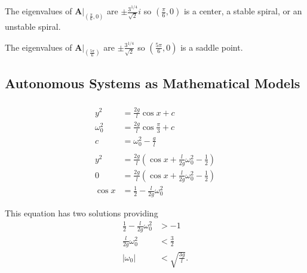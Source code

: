 \documentclass{article}
\begin{document}
\begin{enumerate}
        The eigenvalues of $\left. \mathbf{A} \right|_{\left( \frac{\pi}{6}, 0 \right)}$ are $\pm \frac{3^{1 / 4}}{\sqrt{2}} i$ so $\left( \frac{\pi}{6}, 0 \right)$ is a center, a stable spiral, or an unstable spiral.

        The eigenvalues of $\left. \mathbf{A} \right|_{\left( \frac{5 \pi}{6} \right)}$ are $\pm \frac{3^{1 / 4}}{\sqrt{2}}$ so $\left( \frac{5 \pi}{6}, 0 \right)$ is a saddle point.
\end{enumerate}

\subsection{Autonomous Systems as Mathematical Models}

\subsubsection{}

\begin{align*}
  y^2        & = \frac{2 g}{l} \cos x + c                                                     \\
  \omega_0^2 & = \frac{2 g}{l} \cos \frac{\pi}{3} + c                                         \\
  c          & = \omega_0^2 - \frac{g}{l}                                                     \\ \\
  y^2        & = \frac{2 g}{l} \left( \cos x + \frac{l}{2 g} \omega_0^2 - \frac{1}{2} \right) \\
  0          & = \frac{2 g}{l} \left( \cos x + \frac{l}{2 g} \omega_0^2 - \frac{1}{2} \right) \\
  \cos x     & = \frac{1}{2} - \frac{l}{2 g} \omega_0^2
\end{align*}

This equation has two solutions providing \begin{align*}
  \frac{1}{2} - \frac{l}{2 g} \omega_0^2 & > -1                    \\
  \frac{l}{2 g} \omega_0^2               & < \frac{3}{2}           \\
  |\omega_0|                             & < \sqrt{\frac{3 g}{l}}.
\end{align*}

\setcounter{subsubsection}{4}
\subsubsection{}
\end{document}
